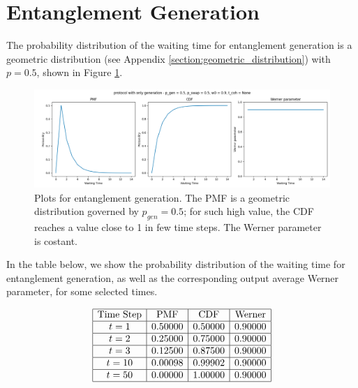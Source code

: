 \documentclass{masterthesis}
\begin{document}
\section*{Entanglement Generation}

The probability distribution of the waiting time for entanglement generation is a geometric distribution (see Appendix \ref{section:geometric_distribution}) with $p = 0.5$, shown in Figure \ref{fig:gen_waiting_time}.
\begin{figure}[ht]
    \centering
    \includegraphics[width=1\linewidth]{images/dist_tests/only generation.png}
    \caption{Plots for entanglement generation. The PMF is a geometric distribution governed by $p_{gen} = 0.5$; for such high value, the CDF reaches a value close to 1 in few time steps. The Werner parameter is costant.}
    \label{fig:gen_waiting_time}
\end{figure}

In the table below, we show the probability distribution of the waiting time for entanglement generation, as well as the corresponding output average Werner parameter, for some selected times.

\begin{equation*}
    \begin{array}{|c|c|c|c|}
        \hline
        \text{Time Step} & \text{PMF} & \text{CDF} & \text{Werner} \\
        \hline
        t = 1 & 0.50000 & 0.50000 & 0.90000 \\
        \hline
        t = 2 & 0.25000 & 0.75000 & 0.90000 \\
        \hline
        t = 3 & 0.12500 & 0.87500 & 0.90000 \\
        \hline
        t = 10 & 0.00098 & 0.99902 & 0.90000 \\
        \hline
        t = 50 & 0.00000 & 1.00000 & 0.90000 \\
        \hline
    \end{array}
    \label{tab:gen_waiting_time}
\end{equation*}
\end{document}
